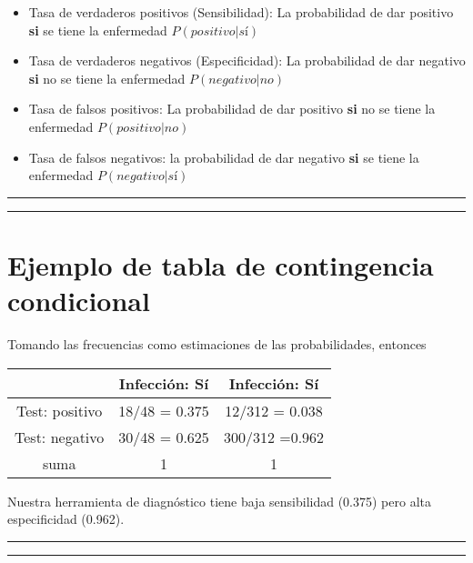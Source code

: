 \documentclass[
]{book}
\begin{document}
\begin{itemize}
\item
  Tasa de verdaderos positivos (Sensibilidad): La probabilidad de dar positivo \textbf{si} se tiene la enfermedad \(P(positivo|sí)\)
\item
  Tasa de verdaderos negativos (Especificidad): La probabilidad de dar negativo \textbf{si} no se tiene la enfermedad \(P(negativo|no)\)
\item
  Tasa de falsos positivos: La probabilidad de dar positivo \textbf{si} no se tiene la enfermedad \(P(positivo|no)\)
\item
  Tasa de falsos negativos: la probabilidad de dar negativo \textbf{si} se tiene la enfermedad \(P(negativo|sí)\)
\end{itemize}

\begin{center}\rule{0.5\linewidth}{0.5pt}\end{center}

\begin{center}\rule{0.5\linewidth}{0.5pt}\end{center}

\hypertarget{ejemplo-de-tabla-de-contingencia-condicional}{%
\section{Ejemplo de tabla de contingencia condicional}\label{ejemplo-de-tabla-de-contingencia-condicional}}

Tomando las frecuencias como estimaciones de las probabilidades, entonces

\begin{longtable}[]{@{}ccc@{}}
\toprule
& Infección: Sí & Infección: Sí \\
\midrule
\endhead
Test: positivo & 18/48 = 0.375 & 12/312 = 0.038 \\
Test: negativo & 30/48 = 0.625 & 300/312 =0.962 \\
suma & 1 & 1 \\
\bottomrule
\end{longtable}

Nuestra herramienta de diagnóstico tiene baja sensibilidad (0.375) pero alta
especificidad (0.962).

\begin{center}\rule{0.5\linewidth}{0.5pt}\end{center}

\begin{center}\rule{0.5\linewidth}{0.5pt}\end{center}
\end{document}
